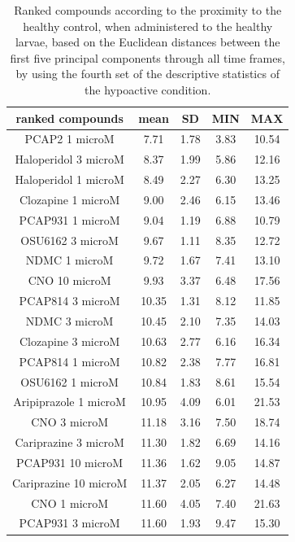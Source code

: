 \documentclass[a4paper,12pt]{article}
\begin{document}
\begin{table}[h!]\tiny
\centering
\caption{Ranked compounds according to the proximity to the healthy control, when administered to the healthy larvae, based on the Euclidean distances between the first five principal components through all time frames, by using the fourth set of the descriptive statistics of the hypoactive condition.}
\begin{tabular}{|c|c|c|c|c|}
\hline
ranked compounds             & mean & SD   & MIN  & MAX   \\ \hline
PCAP2 1 microM         & 7.71  & 1.78 & 3.83  & 10.54 \\ \hline
Haloperidol 3 microM   & 8.37  & 1.99 & 5.86  & 12.16 \\ \hline
Haloperidol 1 microM   & 8.49  & 2.27 & 6.30   & 13.25 \\ \hline
Clozapine 1 microM     & 9.00     & 2.46 & 6.15  & 13.46 \\ \hline
PCAP931 1 microM       & 9.04  & 1.19 & 6.88  & 10.79 \\ \hline
OSU6162 3 microM       & 9.67  & 1.11 & 8.35  & 12.72 \\ \hline
NDMC 1 microM          & 9.72  & 1.67 & 7.41  & 13.10  \\ \hline
CNO 10 microM          & 9.93  & 3.37 & 6.48  & 17.56 \\ \hline
PCAP814 3 microM       & 10.35 & 1.31 & 8.12  & 11.85 \\ \hline
NDMC 3 microM          & 10.45 & 2.10  & 7.35  & 14.03 \\ \hline
Clozapine 3 microM     & 10.63 & 2.77 & 6.16  & 16.34 \\ \hline
PCAP814 1 microM       & 10.82 & 2.38 & 7.77  & 16.81 \\ \hline
OSU6162 1 microM       & 10.84 & 1.83 & 8.61  & 15.54 \\ \hline
Aripiprazole 1 microM  & 10.95 & 4.09 & 6.01  & 21.53 \\ \hline
CNO 3 microM           & 11.18 & 3.16 & 7.50   & 18.74 \\ \hline
Cariprazine 3 microM   & 11.30  & 1.82 & 6.69  & 14.16 \\ \hline
PCAP931 10 microM      & 11.36 & 1.62 & 9.05  & 14.87 \\ \hline
Cariprazine 10 microM  & 11.37 & 2.05 & 6.27  & 14.48 \\ \hline
CNO 1 microM           & 11.60  & 4.05 & 7.40   & 21.63 \\ \hline
PCAP931 3 microM       & 11.60  & 1.93 & 9.47  & 15.30  \\ \hline

\end{tabular}
\end{table}
\end{document}
